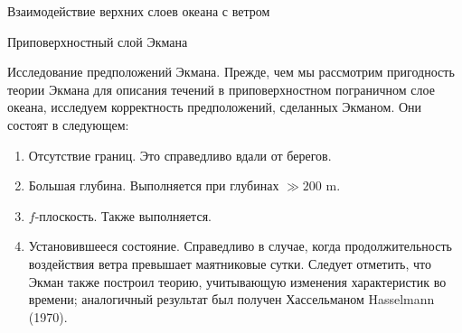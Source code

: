 \begin{chapter}{Взаимодействие верхних слоев океана с ветром}
\begin{section}{Приповерхностный слой Экмана}
\begin{paragraph}{Исследование предположений Экмана.}
Прежде, 
чем мы рассмотрим пригодность теории Экмана для описания течений в 
приповерхностном пограничном слое океана, исследуем корректность
предположений, сделанных Экманом. Они состоят в следующем:
%
%
\begin{enumerate}
\item 
Отсутствие границ. Это справедливо вдали от берегов.

\item 
Большая глубина. Выполняется при глубинах $\gg 200$ m.

\item 
$f$-плоскость. Также выполняется.

\item 
Установившееся состояние. Справедливо в случае, когда продолжительность 
воздействия ветра превышает маятниковые сутки. Следует отметить, что Экман
также построил теорию, учитывающую изменения характеристик во времени;
аналогичный результат был получен Хассельманом Hasselmann (1970).
%


\end{enumerate}
\end{paragraph}
\end{section}
\end{chapter}

